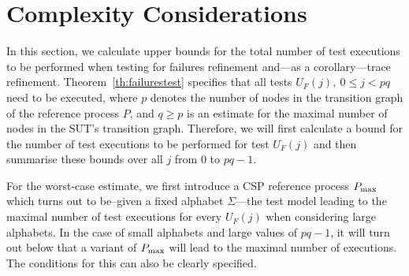 \section{Complexity Considerations}
\label{sec:complexity}

In this section, we calculate upper bounds for the total number of test
executions to be performed when testing for failures refinement 
and---as a corollary---trace refinement.
Theorem~\ref{th:failurestest} specifies that all tests $U_F(j),\ 0\le j < pq$
need to be executed, where $p$ denotes the number of nodes in the transition
graph of the reference process $P$, and $q\ge p$ is an estimate for the
maximal number of nodes in the SUT's transition graph. Therefore, we will first
calculate a bound for the number of test executions to be performed for test
$U_F(j)$ and then summarise  these bounds over all $j$ from $0$ to $pq-1$.

For the worst-case estimate, we first introduce a CSP reference process $P_\text{max}$
which 
turns out to be--given a fixed alphabet $\Sigma$---the test 
model leading to the maximal number 
of test executions for every $U_F(j)$ when considering large alphabets. In the case
of small alphabets and large values of $pq-1$, it will turn out below that a variant
of $P_\text{max}$ will lead to the maximal number of executions. The conditions for this
can also be clearly specified.







